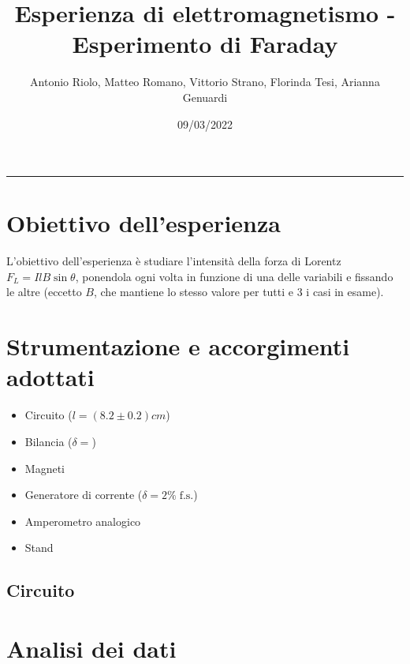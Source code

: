 \documentclass[11pt, a4paper]{article}
\title{Esperienza di elettromagnetismo - Esperimento di Faraday}
\author{Antonio Riolo, Matteo Romano, Vittorio Strano, Florinda Tesi, Arianna Genuardi}
\date{09/03/2022} %
\numberwithin{equation}{section} %
\begin{document}
\maketitle

\tableofcontents

\rule{\textwidth}{1px}

    \section{Obiettivo dell'esperienza}

    L'obiettivo dell'esperienza è studiare l'intensità della forza di Lorentz $F_{L} = IlB \sin \theta$, ponendola ogni volta in funzione di una delle variabili e fissando le altre (eccetto $B$, che mantiene lo stesso valore per tutti e 3 i casi in esame).

    \section{Strumentazione e accorgimenti adottati} %

    \begin{itemize}
        \item Circuito ($l = (8.2 \pm 0.2)cm$)
        \item Bilancia ($\delta =$) %
        \item Magneti 
        \item Generatore di corrente ($\delta = 2\% \; \text{f.s.}$) %
        \item Amperometro analogico
        \item Stand %
    \end{itemize}


    \subsection{Circuito}


    \section{Analisi dei dati}
    
\end{document}
